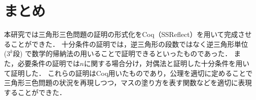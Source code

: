 \section{まとめ}
本研究では三角形三色問題の証明の形式化をCoq（SSReflect）を用いて完成させることができた．
十分条件の証明では，逆三角形の段数ではなく逆三角形単位 ($3^k$段) で数学的帰納法の用いることで証明できるといったものであった．
また，必要条件の証明では$n$に関する場合分け，対偶法と証明した十分条件を用いて証明した．
これらの証明はCoq用いたものであり，公理を適切に定めることで三角形三色問題の状況を再現しつつ，マスの塗り方を表す関数などを適切に表現することができた．
